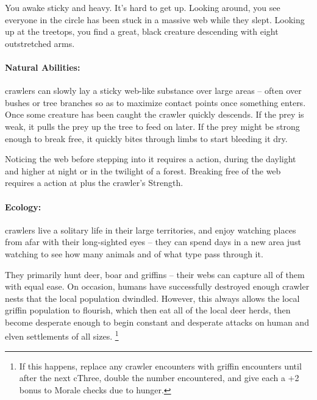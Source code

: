 \begin{multicols}{2}
\chitincrawler

\begin{boxtext}
  You awake sticky and heavy.
  It's hard to get up.
  Looking around, you see everyone in the circle has been stuck in a massive web while they slept.
  Looking up at the treetops, you find a great, black creature descending with eight outstretched arms.
\end{boxtext}

\paragraph{Natural Abilities:} \Glspl{crawler} can slowly lay a sticky web-like substance over large areas -- often over bushes or tree branches so as to maximize contact points once something enters.
Once some creature has been caught the \gls{crawler} quickly descends.
If the prey is weak, it pulls the prey up the tree to feed on later.
If the prey might be strong enough to break free, it quickly bites through limbs to start bleeding it dry.

Noticing the web before stepping into it requires a  action, \tn[7] during the daylight and higher at night or in the twilight of a forest.
Breaking free of the web requires a  action at \tn[7] plus the \gls{crawler}'s Strength.

\paragraph{Ecology:}
\glspl{crawler} live a solitary life in their large territories, and enjoy watching places from afar with their long-sighted eyes -- they can spend days in a new area just watching to see how many animals and of what type pass through it.

They primarily hunt deer, boar and \glspl{griffin} -- their webs can capture all of them with equal ease.
On occasion, humans have successfully destroyed enough \gls{crawler} nests that the local population dwindled.
However, this always allows the local \gls{griffin} population to flourish, which then eat all of the local deer herds, then become desperate enough to begin constant and desperate attacks on human and elven settlements of all sizes.%
\footnote{If this happens, replace any \gls{crawler} encounters with \gls{griffin} encounters until after the next \gls{cThree}, double the number encountered, and give each a +2 bonus to Morale checks due to hunger.}
\label{crawlerBalance}


\end{multicols}
